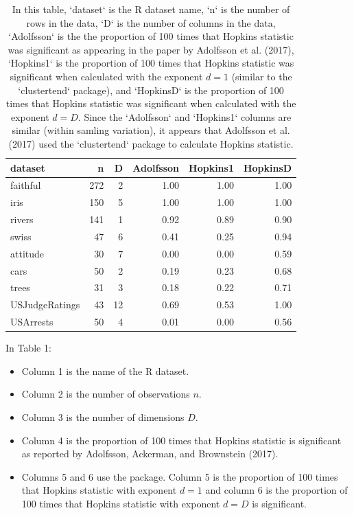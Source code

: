 \begin{table}

\caption{\label{tab:tabstatic}In this table, `dataset` is the R dataset name, `n` is the number of rows in the data, `D` is the number of columns in the data, `Adolfsson` is the the proportion of 100 times that Hopkins statistic was significant as appearing in the paper by Adolfsson et al. (2017), `Hopkins1` is the proportion of 100 times that Hopkins statistic was significant when calculated with the exponent $d=1$ (similar to the `clustertend` package), and `HopkinsD` is the proportion of 100 times that Hopkins statistic was significant when calculated with the exponent $d=D$. Since the `Adolfsson` and `Hopkins1` columns are similar (within samling variation), it appears that Adolfsson et al. (2017) used the `clustertend` package to calculate Hopkins statistic.}
\centering
\fontsize{7}{9}\selectfont
\begin{tabular}[t]{l|r|r|r|r|r}
\hline
dataset & n & D & Adolfsson & Hopkins1 & HopkinsD\\
\hline
faithful & 272 & 2 & 1.00 & 1.00 & 1.00\\
\hline
iris & 150 & 5 & 1.00 & 1.00 & 1.00\\
\hline
rivers & 141 & 1 & 0.92 & 0.89 & 0.90\\
\hline
swiss & 47 & 6 & 0.41 & 0.25 & 0.94\\
\hline
attitude & 30 & 7 & 0.00 & 0.00 & 0.59\\
\hline
cars & 50 & 2 & 0.19 & 0.23 & 0.68\\
\hline
trees & 31 & 3 & 0.18 & 0.22 & 0.71\\
\hline
USJudgeRatings & 43 & 12 & 0.69 & 0.53 & 1.00\\
\hline
USArrests & 50 & 4 & 0.01 & 0.00 & 0.56\\
\hline
\end{tabular}
\end{table}

In Table 1:

\begin{itemize}
\tightlist
\item
  Column 1 is the name of the R dataset.
\item
  Column 2 is the number of observations \(n\).
\item
  Column 3 is the number of dimensions \(D\).
\item
  Column 4 is the proportion of 100 times that Hopkins statistic is significant as reported by Adolfsson, Ackerman, and Brownstein (2017).
\item
  Columns 5 and 6 use the  package. Column 5 is the proportion of 100 times that Hopkins statistic with exponent \(d=1\) and column 6 is the proportion of 100 times that Hopkins statistic with exponent \(d=D\) is significant.
\end{itemize}


